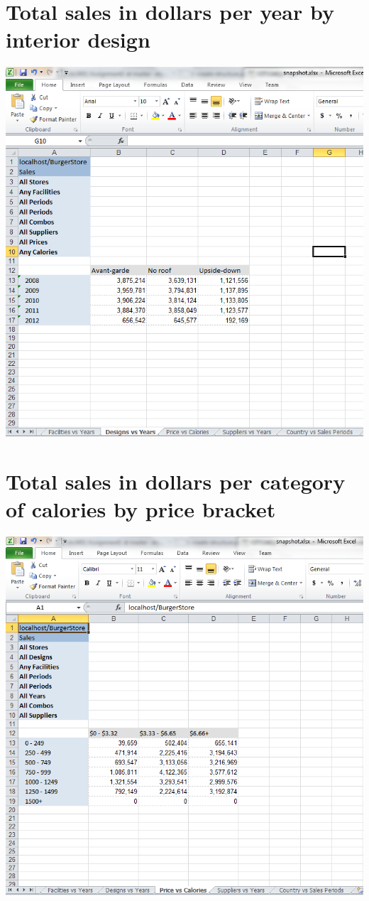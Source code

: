 \documentclass[12pt, a4paper]{article}
\begin{document}
\section{Total sales in dollars per year by interior design}
\includegraphics{diagrams/DesignsVsYears}

\section{Total sales in dollars per category of calories by price bracket}
\includegraphics{diagrams/PriceVsCalories}
\end{document}

